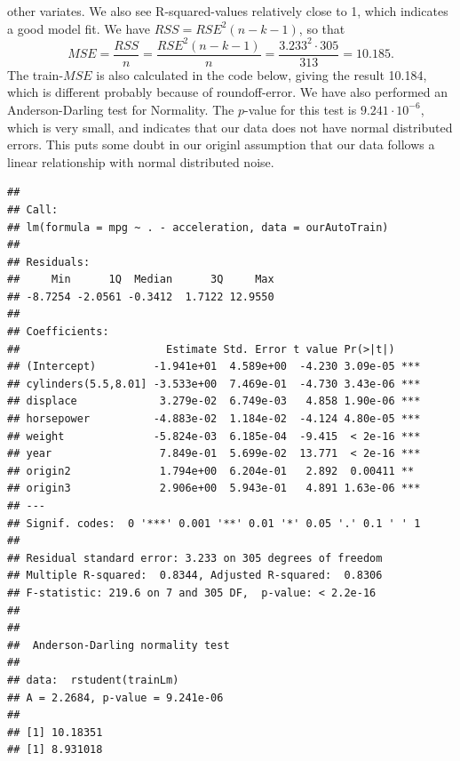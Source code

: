 \documentclass[]{article}
\newenvironment{Shaded}{\begin{snugshade}}{\end{snugshade}}
\newcommand{\KeywordTok}[1]{\textcolor[rgb]{0.13,0.29,0.53}{\textbf{#1}}}
\newcommand{\DataTypeTok}[1]{\textcolor[rgb]{0.13,0.29,0.53}{#1}}
\newcommand{\DecValTok}[1]{\textcolor[rgb]{0.00,0.00,0.81}{#1}}
\newcommand{\OperatorTok}[1]{\textcolor[rgb]{0.81,0.36,0.00}{\textbf{#1}}}
\newcommand{\NormalTok}[1]{#1}
\begin{document}
\begin{itemize}
  other variates. We also see R-squared-values relatively close to 1,
  which indicates a good model fit. We have \(RSS=RSE^2(n-k-1)\), so
  that
  \[MSE=\frac{RSS}{n}=\frac{RSE^2(n-k-1)}{n}=\frac{3.233^2\cdot 305}{313}=10.185.\]
  The train-\(MSE\) is also calculated in the code below, giving the
  result 10.184, which is different probably because of roundoff-error.
  We have also performed an Anderson-Darling test for Normality. The
  \(p\)-value for this test is \(9.241\cdot 10^{-6}\), which is very
  small, and indicates that our data does not have normal distributed
  errors. This puts some doubt in our originl assumption that our data
  follows a linear relationship with normal distributed noise.
\end{itemize}

\begin{Shaded}
\end{Shaded}

\begin{verbatim}
## 
## Call:
## lm(formula = mpg ~ . - acceleration, data = ourAutoTrain)
## 
## Residuals:
##     Min      1Q  Median      3Q     Max 
## -8.7254 -2.0561 -0.3412  1.7122 12.9550 
## 
## Coefficients:
##                       Estimate Std. Error t value Pr(>|t|)    
## (Intercept)         -1.941e+01  4.589e+00  -4.230 3.09e-05 ***
## cylinders(5.5,8.01] -3.533e+00  7.469e-01  -4.730 3.43e-06 ***
## displace             3.279e-02  6.749e-03   4.858 1.90e-06 ***
## horsepower          -4.883e-02  1.184e-02  -4.124 4.80e-05 ***
## weight              -5.824e-03  6.185e-04  -9.415  < 2e-16 ***
## year                 7.849e-01  5.699e-02  13.771  < 2e-16 ***
## origin2              1.794e+00  6.204e-01   2.892  0.00411 ** 
## origin3              2.906e+00  5.943e-01   4.891 1.63e-06 ***
## ---
## Signif. codes:  0 '***' 0.001 '**' 0.01 '*' 0.05 '.' 0.1 ' ' 1
## 
## Residual standard error: 3.233 on 305 degrees of freedom
## Multiple R-squared:  0.8344, Adjusted R-squared:  0.8306 
## F-statistic: 219.6 on 7 and 305 DF,  p-value: < 2.2e-16
## 
## 
##  Anderson-Darling normality test
## 
## data:  rstudent(trainLm)
## A = 2.2684, p-value = 9.241e-06
## 
## [1] 10.18351
## [1] 8.931018
\end{verbatim}
\end{document}
